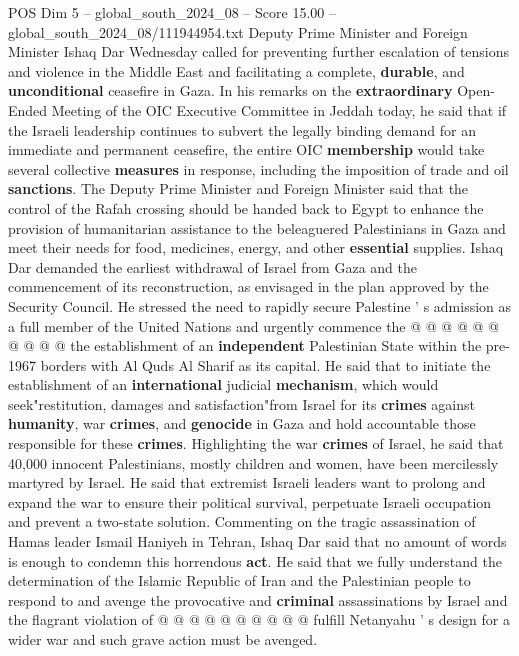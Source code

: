 \begin{textsample}{POS Dim 5 – global\_south\_2024\_08 – Score 15.00 – global\_south\_2024\_08/111944954.txt}  \label{ex:f5_pos_321}
Deputy Prime Minister and Foreign Minister Ishaq Dar Wednesday called for preventing further escalation of tensions and violence in the Middle East and facilitating a complete, \textbf{durable}, and \textbf{unconditional} ceasefire in Gaza.
In his remarks on the \textbf{extraordinary} Open-Ended Meeting of the OIC Executive Committee in Jeddah today, he said that if the Israeli leadership continues to subvert the legally binding demand for an immediate and permanent ceasefire, the entire OIC \textbf{membership} would take several collective \textbf{measures} in response, including the imposition of trade and oil \textbf{sanctions}.
The Deputy Prime Minister and Foreign Minister said that the control of the Rafah crossing should be handed back to Egypt to enhance the provision of humanitarian assistance to the beleaguered Palestinians in Gaza and meet their needs for food, medicines, energy, and other \textbf{essential} supplies.
Ishaq Dar demanded the earliest withdrawal of Israel from Gaza and the commencement of its reconstruction, as envisaged in the plan approved by the Security Council.
He stressed the need to rapidly secure Palestine ' s admission as a full member of the United Nations and urgently commence the @ @ @ @ @ @ @ @ @ @ the establishment of an \textbf{independent} Palestinian State within the pre-1967 borders with Al Quds Al Sharif as its capital.
He said that to initiate the establishment of an \textbf{international} judicial \textbf{mechanism}, which would seek"restitution, damages and satisfaction"from Israel for its \textbf{crimes} against \textbf{humanity}, war \textbf{crimes}, and \textbf{genocide} in Gaza and hold accountable those responsible for these \textbf{crimes}.
Highlighting the war \textbf{crimes} of Israel, he said that 40,000 innocent Palestinians, mostly children and women, have been mercilessly martyred by Israel.
He said that extremist Israeli leaders want to prolong and expand the war to ensure their political survival, perpetuate Israeli occupation and prevent a two-state solution.
Commenting on the tragic assassination of Hamas leader Ismail Haniyeh in Tehran, Ishaq Dar said that no amount of words is enough to condemn this horrendous \textbf{act}.
He said that we fully understand the determination of the Islamic Republic of Iran and the Palestinian people to respond to and avenge the provocative and \textbf{criminal} assassinations by Israel and the flagrant violation of @ @ @ @ @ @ @ @ @ @ fulfill Netanyahu ' s design for a wider war and such grave action must be avenged.

\end{textsample}
